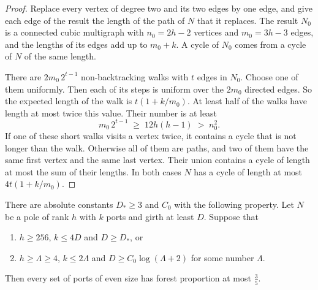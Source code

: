 \begin{proof}
Replace every vertex of degree two and its two edges by one edge, and give each edge of the result
the length of the path of $N$ that it replaces. The result $N_0$ is a connected cubic multigraph
with $n_0=2h-2$ vertices and $m_0=3h-3$ edges, and the lengths of its edges add up to $m_0+k$. A
cycle of $N_0$ comes from a cycle of $N$ of the same length.

There are $2m_0\,2^{t-1}$ non-backtracking walks with $t$ edges in $N_0$. Choose one of them
uniformly. Then each of its steps is uniform over the $2m_0$ directed edges. So the expected length
of the walk is $t(1+k/m_0)$. At least half of the walks have length at most twice this value. Their
number is at least
\[
  m_0\,2^{t-1}\;\ge\;12h(h-1)\;>\;n_0^{2}.
\]
If one of these short walks visits a vertex twice, it contains a cycle that is not longer than the
walk. Otherwise all of them are paths, and two of them have the same first vertex and the same last
vertex. Their union contains a cycle of length at most the sum of their lengths. In both cases $N$
has a cycle of length at most $4t(1+k/m_0)$.
\end{proof}

\begin{lemma}\label{lem:affine}
There are absolute constants $D_{*}\ge3$ and $C_0$ with the following property. Let $N$ be a pole
of rank $h$ with $k$ ports and girth at least $D$. Suppose that
\begin{enumerate}
\item[\textup{(a)}] $h\ge256$, $k\le4D$ and $D\ge D_{*}$, or
\item[\textup{(b)}] $h\ge\Lambda\ge4$, $k\le2\Lambda$ and $D\ge C_0\log(\Lambda+2)$ for some
number $\Lambda$.
\end{enumerate}
Then every set of ports of even size has forest proportion at most $\frac35$.
\end{lemma}

